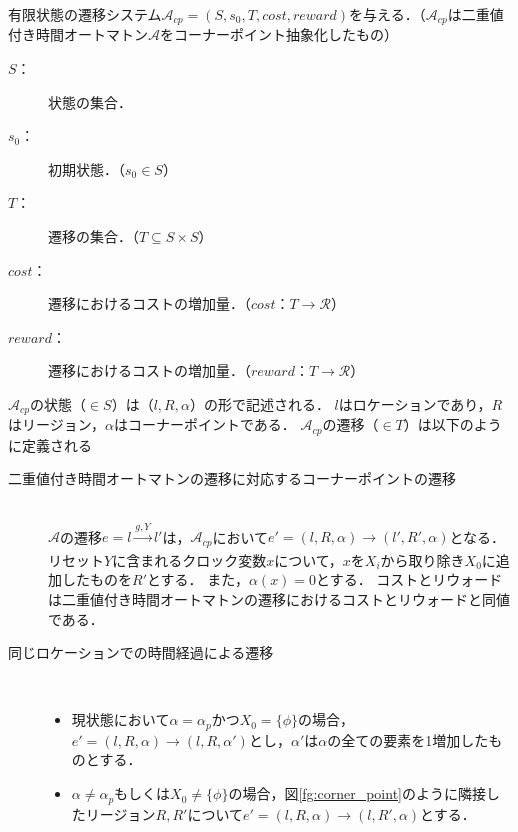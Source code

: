 \documentclass{ieicej}
\begin{document}
	有限状態の遷移システム$\mathcal{A}_{cp} = (S, s_0, T, cost, reward)$を与える．（$\mathcal{A}_{cp}$は二重値付き時間オートマトン$\mathcal{A}$をコーナーポイント抽象化したもの）
	\begin{description}
		\item [$S$：] 状態の集合．
		\item [$s_0$：] 初期状態．（$s_0 \in S$）
		\item [$T$：] 遷移の集合．（$T \subseteq S \times S$）
		\item [$cost$：] 遷移におけるコストの増加量．（$cost：T \rightarrow \mathcal{R}$）
		\item [$reward$：] 遷移におけるコストの増加量．（$reward：T \rightarrow \mathcal{R}$）
	\end{description}

$\mathcal{A}_{cp}$の状態（$\in S$）は（$l, R, \alpha$）の形で記述される．
$l$はロケーションであり，$R$はリージョン，$\alpha$はコーナーポイントである．
$\mathcal{A}_{cp}$の遷移（$\in T$）は以下のように定義される

\begin{description}
	\item [二重値付き時間オートマトンの遷移に対応するコーナーポイントの遷移] \mbox{} \\
		$\mathcal{A}$の遷移$e = l \xrightarrow[]{g, Y} l'$は，$\mathcal{A}_{cp}$において$e' = (l, R, \alpha) \rightarrow (l', R', \alpha )$となる．
		リセット$Y$に含まれるクロック変数$x$について，$x$を$X_i$から取り除き$X_0$に追加したものを$R'$とする．		
		また，$\alpha(x) = 0$とする．
		コストとリウォードは二重値付き時間オートマトンの遷移におけるコストとリウォードと同値である．
	\item [同じロケーションでの時間経過による遷移] \mbox{} \\
		\begin{itemize}
			\item 現状態において$\alpha = \alpha_p$かつ$X_0 = \{ \phi \}$の場合，$e' = (l, R, \alpha) \rightarrow (l, R, \alpha' )$とし，$\alpha'$は$\alpha$の全ての要素を1増加したものとする．
			\item $\alpha \neq \alpha_p$もしくは$X_0 \neq \{ \phi \}$の場合，図\ref{fg:corner_point}のように隣接したリージョン$R,R'$について$e' = (l, R, \alpha) \rightarrow (l, R', \alpha)$とする．
		\end{itemize}
\end{description}
\end{document}
